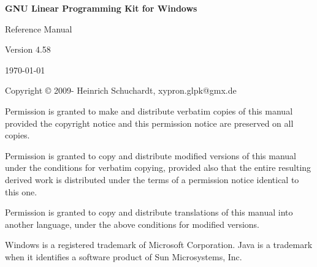 \documentclass[a4paper,11pt]{report}
\newcommand{\glpkVersion}{4.58}
\begin{document}
\thispagestyle{empty}

\begin{center}

\vspace*{1in}

\begin{huge}
\sf\bfseries GNU Linear Programming Kit\linebreak
for Windows
\end{huge}

\vspace{0.5in}

\begin{LARGE}
\sf Reference Manual
\end{LARGE}

\vspace{0.5in}

\begin{LARGE}
\sf Version \glpkVersion
\end{LARGE}

\vspace{0.5in}
\begin{Large}
\sf \today
\end{Large}
\end{center}

\newpage

\vspace*{1in}

\vfill

\medskip \noindent
Copyright \copyright{} 2009-{\the\year} Heinrich Schuchardt, xypron.glpk@gmx.de

\medskip \noindent
Permission is granted to make and distribute verbatim copies of this
manual provided the copyright notice and this permission notice are
preserved on all copies.

\medskip \noindent
Permission is granted to copy and distribute modified versions of this
manual under the conditions for verbatim copying, provided also that the
entire resulting derived work is distributed under the terms of
a permission notice identical to this one.

\medskip \noindent
Permission is granted to copy and distribute translations of this manual
into another language, under the above conditions for modified versions.

\medskip \noindent
Windows is a registered trademark of Microsoft Corporation. Java is a 
trademark when it identifies a software product of Sun Microsystems, Inc.

\tableofcontents
\end{document}
